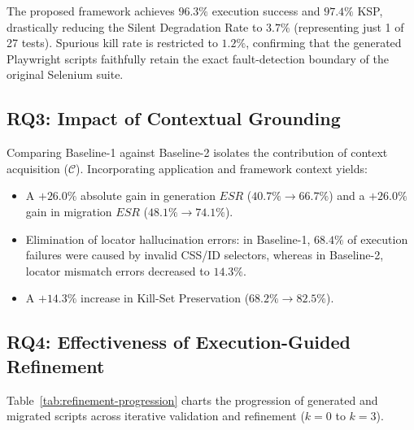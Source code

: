 \documentclass[pdflatex,sn-mathphys-num]{sn-jnl}
\begin{document}
The proposed framework achieves $96.3\%$ execution success and $97.4\%$ KSP,
drastically reducing the Silent Degradation Rate to $3.7\%$ (representing just 1 of 27
tests). Spurious kill rate is restricted to $1.2\%$, confirming that the generated
Playwright scripts faithfully retain the exact fault-detection boundary of the
original Selenium suite.

\subsection{RQ3: Impact of Contextual Grounding}
\label{subsec:rq3-results}

Comparing Baseline-1 against Baseline-2 isolates the contribution of context
acquisition ($\mathcal{C}$). Incorporating application and framework context yields:
\begin{itemize}[leftmargin=*]
    \item A $+26.0\%$ absolute gain in generation $ESR$ ($40.7\% \to 66.7\%$) and a $+26.0\%$ gain in migration $ESR$ ($48.1\% \to 74.1\%$).
    \item Elimination of locator hallucination errors: in Baseline-1, $68.4\%$ of execution failures were caused by invalid CSS/ID selectors, whereas in Baseline-2, locator mismatch errors decreased to $14.3\%$.
    \item A $+14.3\%$ increase in Kill-Set Preservation ($68.2\% \to 82.5\%$).
\end{itemize}

\subsection{RQ4: Effectiveness of Execution-Guided Refinement}
\label{subsec:rq4-results}

Table~\ref{tab:refinement-progression} charts the progression of generated and migrated
scripts across iterative validation and refinement ($k = 0$ to $k = 3$).
\end{document}
